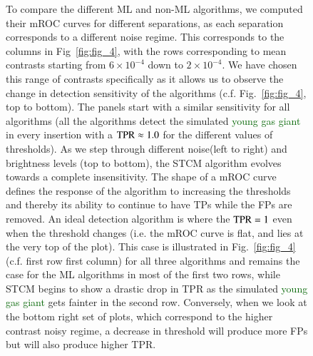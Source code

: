 \documentclass{aa}
\newcommand{\newchange}[1]{\textcolor{darkgreen}{#1}}
\begin{document}
{{{\begin{figure}[t]
{To compare the different ML and non-ML algorithms, we computed their mROC curves for different separations, as each separation corresponds to a different noise regime.
This corresponds to the columns in Fig~\ref{fig:fig_4}, with the rows corresponding to mean contrasts starting from $6\times10^{-4}$ down to $2\times10^{-4}$.
We have chosen this range of contrasts specifically as it allows us to observe the change in detection sensitivity of the algorithms (c.f. Fig.~\ref{fig:fig_4}, top to bottom). The panels start with a similar sensitivity for all algorithms (all the algorithms detect the simulated \newchange{young gas giant} in every insertion with a ${\rm TPR}\approx 1.0$ for the different values of thresholds). 
As we step through different noise(left to right) and brightness levels (top to bottom), the STCM algorithm evolves towards a complete insensitivity.
The shape of a mROC curve defines the response of the algorithm to increasing the thresholds and thereby its ability to continue to have TPs while the FPs are removed.
An ideal detection algorithm is where the ${\rm TPR}=1$ even when the threshold changes (i.e. the mROC curve is flat, and lies at the very top of the plot).
This case is illustrated in Fig.~\ref{fig:fig_4}  (c.f. first row first column) for all three algorithms and remains the case for the ML algorithms in most of the first two rows, while STCM begins to show a drastic drop in TPR as the simulated \newchange{young gas giant} gets fainter in the second row.
Conversely, when we look at the bottom right set of plots, which correspond to the higher contrast noisy regime, a decrease in threshold will produce more FPs but will also produce higher TPR. 

}
\end{figure}}}}
\end{document}
